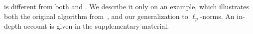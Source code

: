 %
\lpflow is different from both \lpbase and \lptdb. We
describe it only on an example, which illustrates both the original algorithm from~\cite{DBLP:journals/corr/abs-2211-08381}, and our generalization to $\ell_p$-norms. An in-depth account is given in the supplementary material.

